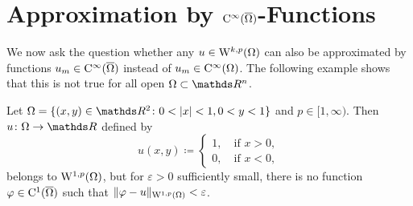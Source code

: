 \section{Approximation by \texorpdfstring{$\mathrm{C}^\infty(\overline{\Omega})$}{C\textasciicircum infty(Omega) }-Functions}

We now ask the question whether any $u \in \mathrm{W}^{k,p}(\Omega)$ can also be approximated by functions $u_m \in \mathrm{C}^\infty(\overline\Omega)$ instead of $u_m \in \mathrm{C}^\infty(\Omega)$.
The following example shows that this is not true for all open $\Omega \subset \R^n$.

\begin{ex}[Exercise]
  \label{ex:noSegmentCondition}
  Let $\Omega = \{(x,y) \in \R^2 \colon 0 < |x| < 1, 0 < y < 1\}$ and $p \in [1,\infty)$.
  Then $u \colon \Omega \to \R$ defined by
  $$
  u(x,y) \coloneqq \begin{cases} 1, \quad\text{if } x > 0,\\ 0, \quad\text{if } x < 0, \end{cases}
  $$
  belongs to $\mathrm{W}^{1,p}(\Omega)$, but for $\varepsilon > 0$ sufficiently small, there is no function $\varphi \in \mathrm{C}^1(\overline\Omega)$ such that $\|\varphi - u\|_{\mathrm{W}^{1,p}(\Omega)} < \varepsilon$. 
  

\end{ex}
